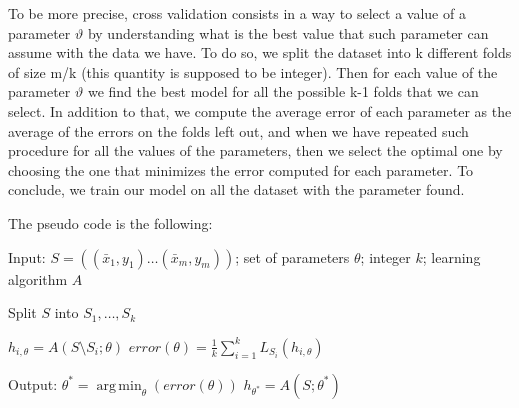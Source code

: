 \documentclass[a4paper,11pt,oneside]{book}
\DeclareMathOperator*{\argmin}{arg\,min}
\begin{document}
\begin{enumerate}
\begin{solution}
        To be more precise, cross validation consists in a way to select a value of a parameter $\vartheta$ by understanding what is the best value that such parameter can assume with the data we have.
        To do so, we split the dataset into k different folds of size m/k (this quantity is supposed to be integer). Then for each value of the parameter $\vartheta$ we find the best model for all the possible k-1 folds that we can select. In addition to that, we compute the average error of each parameter as the average of the errors on the folds left out, and when we have repeated such procedure for all the values of the parameters, then we select the optimal one by choosing the one that minimizes the error computed for each parameter. To conclude, we train our model on all the dataset with the parameter found.
        
        The pseudo code is the following:
        \begin{algorithmic}[1]
            \State Input: $S = ((\bar{x}_1, y_1) \ldots (\bar{x}_m, y_m))$; set of parameters $\theta$; integer $k$; learning algorithm $A$
            
            \State Split $S$ into $S_1, \ldots, S_k$
            
            \For{$\theta \in \Theta$}
                    \State $h_{i,\theta} = A(S\setminus S_i; \theta)$
                    \State $error(\theta) = \frac{1}{k}\sum_{i=1}^k L_{S_i}(h_{i,\theta})$
                \EndFor
            \EndFor
            
            \State Output: $\theta^* = \argmin_\theta(error(\theta))$
            \State $h_{\theta^*} = A(S; \theta^*)$
        \end{algorithmic}
    \end{solution}
\end{enumerate}

\clearpage
\end{document}
